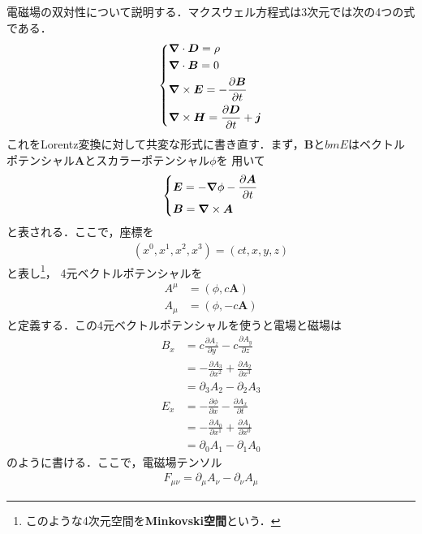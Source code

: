 \documentclass{report}
\begin{document}
  電磁場の双対性について説明する．マクスウェル方程式は3次元では次の4つの式である．
  \begin{align}
    \begin{dcases}
      \grad \cdot \bm{D} = \rho \\
      \grad \cdot \bm{B} = 0\\
      \grad \times \bm{E} = - \frac{\partial \bm{B}}{\partial t}\\
      \grad \times \bm{H} = \frac{\partial \bm{D}}{\partial t} + \bm{j}
    \end{dcases}
  \end{align}
  これをLorentz変換に対して共変な形式に書き直す．まず，$\bm{B}$と$bm{E}$はベクトルポテンシャル$\bm{A}$とスカラーポテンシャル$\phi$を
  用いて
  \begin{align}
    \begin{dcases}
      \bm{E} = -\grad \phi - \frac{\partial \bm{A}}{\partial t}\\
      \bm{B} = \grad \times \bm{A}
    \end{dcases}
  \end{align}
  と表される．ここで，座標を
  \begin{align}
    (x^0, x^1, x^2, x^3) = (ct, x, y, z)
  \end{align}
  と表し\footnote{
   このような4次元空間を\textbf{Minkovski空間}という． 
  }，
  4元ベクトルポテンシャルを
  \begin{align}
    A^{\mu} &= (\phi, c\bm{A})\\
    A_{\mu} &= (\phi, -c\bm{A})
  \end{align}
  と定義する．この4元ベクトルポテンシャルを使うと電場と磁場は
  \begin{align}
    B_x &= c \frac{\partial A_z}{\partial y} - c \frac{\partial A_y}{\partial z}\\
    &= -\frac{\partial A_3}{\partial x^2} + \frac{\partial A_2}{\partial x^3}\\
    &= \partial_3 A_2 - \partial_2 A_3\\
    E_x &= -\frac{\partial \phi}{\partial x} - \frac{\partial A_x}{\partial t}\\
    &= -\frac{\partial A_0}{\partial x^1} + \frac{\partial A_1}{\partial x^0}\\
    &= \partial_0 A_1 - \partial_1 A_0
  \end{align}
  のように書ける．ここで，電磁場テンソル
  \begin{align}
    F_{\mu\nu} = \partial_{\mu}A_\nu - \partial_\nu A_\mu
  \end{align}
\end{document}
